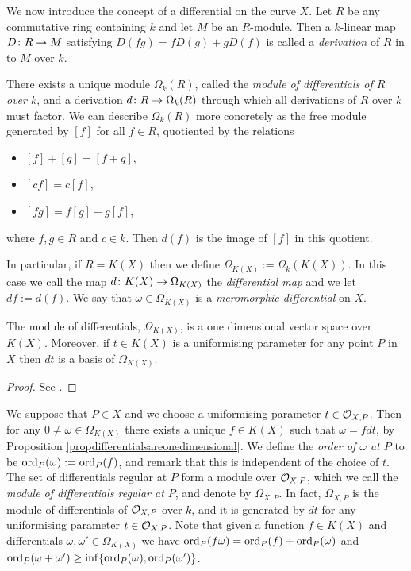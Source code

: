 We now introduce the concept of a differential on the curve $X$.
Let $R$ be any commutative ring containing $k$ and let $M$ be an $R$-module.
Then a $k$-linear map $D \colon R \rightarrow M$ satisfying $D(fg) = fD(g) + gD(f)$ is called a \emph{derivation} of $R$ in to $M$ over $k$.

There exists a unique module $\Omega_k(R)$, called the \emph{module of differentials of $R$ over $k$}, and a derivation $d \colon R \rightarrow \Omega_k(R)$ through which all derivations of $R$ over $k$ must factor.
We can describe $\Omega_k(R)$ more concretely as the free module generated by $[f]$ for all $f \in R$, quotiented by the relations
    \begin{itemize}
    \item $[f]+[g] = [f+g]$,
    \item $[cf] = c[f]$,
    \item $[fg] = f[g] + g[f]$,
    \end{itemize}
where $f, g \in R$ and $c \in k$.
Then $d(f)$ is the image of $[f]$ in this quotient.

In particular, if $R = K(X)$ then we define $\Omega_{K(X)} := \Omega_k(K(X))$.
In this case we call the map $d \colon K(X) \rightarrow \Omega_{K(X)}$ the \emph{differential map} and we let $df := d(f)$.
We say that $\omega \in \Omega_{K(X)}$ is a \emph{meromorphic differential} on $X$.

    \begin{prop}\label{propdifferentialsareonedimensional}
    The module of differentials, $\Omega_{K(X)}$, is a one dimensional vector space over $K(X)$.
    Moreover, if $t \in K(X)$ is a uniformising parameter for any point $P$ in $X$ then $dt$ is a basis of $\Omega_{K(X)}$.
    \end{prop}
    \begin{proof}
    See \cite[Prop. 1.5.9]{stichtenoth}.
    \end{proof}

We suppose that $P \in X$ and we choose a uniformising parameter $t \in {\cal O}_{X,P}$.
Then for any $ 0 \neq \omega \in \Omega_{K(X)}$ there exists a unique $f \in K(X)$ such that $\omega = fdt$, by Proposition \ref{propdifferentialsareonedimensional}.
We define the \emph{order of $\omega$ at $P$} to be $\operatorname{ord}_P(\omega) := \operatorname{ord}_P(f)$, and remark that this is independent of the choice of $t$.
The set of differentials regular at $P$ form a module over ${\cal O}_{X,P}$, which we call the \emph{module of differentials regular at $P$}, and denote by $\Omega_{X,P}$.
In fact, $\Omega_{X,P}$ is the module of differentials of ${\cal O}_{X,P}$ over $k$, and it is generated by $dt$ for any uniformising parameter $t \in {\cal O}_{X,P}$.
Note that given a function $f \in K(X)$ and differentials $\omega, \omega' \in \Omega_{K(X)}$ we have $\operatorname{ord}_P(f\omega) = \operatorname{ord}_P(f) + \operatorname{ord}_P(\omega)$ and $\operatorname{ord}_P(\omega + \omega') \geq \inf\{\operatorname{ord}_P(\omega), \operatorname{ord}_P(\omega')\}$.

